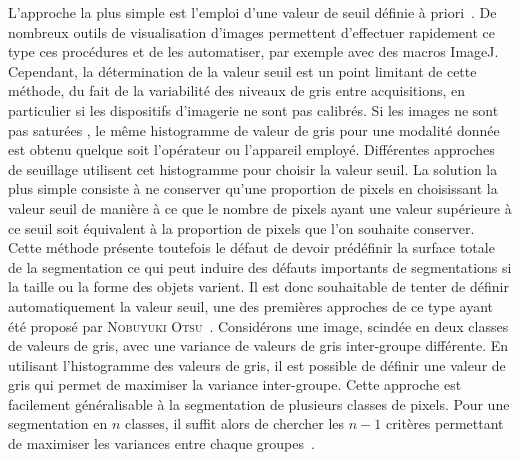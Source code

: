 \documentclass[\main/main.tex]{subfiles}
\begin{document}
L'approche la plus simple est l'emploi d'une valeur de seuil définie à priori~\cite{hinfray_2018}.
%
De nombreux outils de visualisation d'images permettent d'effectuer rapidement ce type ces procédures et de les automatiser, par exemple avec des macros ImageJ.
%
Cependant, la détermination de la valeur seuil est un point limitant de cette méthode, du fait de la variabilité des niveaux de gris entre acquisitions, en particulier si les dispositifs d'imagerie ne sont pas calibrés.
%
Si les images ne sont pas saturées , le même histogramme de valeur de gris pour une modalité donnée est obtenu quelque soit l'opérateur ou l'appareil employé.
%
Différentes approches de seuillage utilisent cet histogramme pour choisir la valeur seuil.
%
La solution la plus simple consiste à ne conserver qu'une proportion de pixels en choisissant la valeur seuil de manière à ce que le nombre de pixels ayant une valeur supérieure à ce seuil soit équivalent à la proportion de pixels que l'on souhaite conserver.
%
Cette méthode présente toutefois le défaut de devoir prédéfinir la surface totale de la segmentation ce qui peut induire des défauts importants de segmentations si la taille ou la forme des objets varient.
%
Il est donc souhaitable de tenter de définir automatiquement la valeur seuil, une des premières approches de ce type ayant été proposé par \textsc{Nobuyuki Otsu}~\cite{otsu_1979}.
%
Considérons une image, scindée en deux classes de valeurs de gris, avec une variance de valeurs de gris inter\hyp{}groupe différente. En utilisant l'histogramme des valeurs de gris, il est possible de définir une valeur de gris qui permet de maximiser la variance inter\hyp{}groupe.
%
Cette approche est facilement généralisable à la segmentation de plusieurs classes de pixels. Pour une segmentation en $n$ classes, il suffit alors de chercher les $n-1$ critères permettant de maximiser les variances entre chaque groupes~\cite{kugler_2019,ibrahim_2020,huang_2020}.
\end{document}
